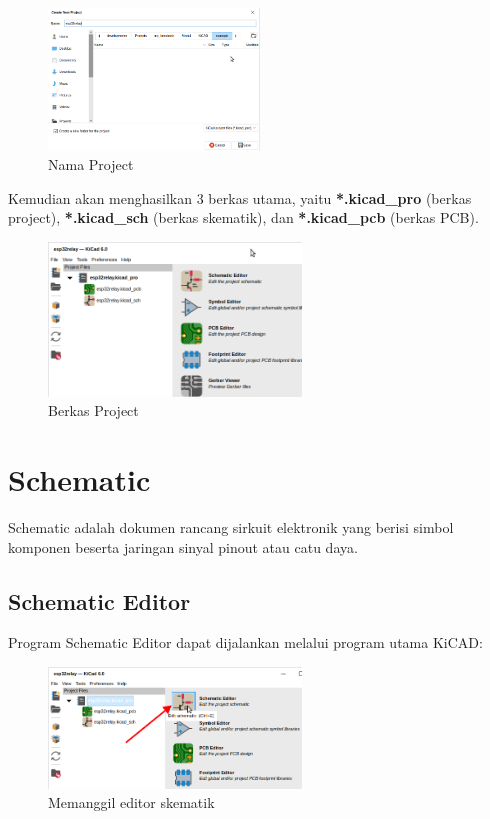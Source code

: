\documentclass[12pt]{book}
\begin{document}
	\begin{figure}[!ht]
		\centering
		\includegraphics[width=0.5\textwidth]{images/main/kicad_new_1}
		\caption{Nama Project}
	\end{figure}

	Kemudian akan menghasilkan 3 berkas utama, yaitu \textbf{*.kicad\_pro} (berkas project),
	\textbf{*.kicad\_sch} (berkas skematik), dan \textbf{*.kicad\_pcb} (berkas PCB).

	\begin{figure}[!ht]
		\centering
		\includegraphics[width=0.6\textwidth]{images/main/kicad_new_2}
		\caption{Berkas Project}
	\end{figure}


	\newpage
	\chapter{Schematic}
	Schematic adalah dokumen rancang sirkuit elektronik yang berisi simbol komponen beserta jaringan sinyal pinout atau catu daya.

	\section{Schematic Editor}

	Program Schematic Editor dapat dijalankan melalui program utama KiCAD:

	\begin{figure}[!ht]
		\centering
		\includegraphics[width=0.6\textwidth]{images/sch/sch_0}
		\caption{Memanggil editor skematik}
	\end{figure}
\end{document}

